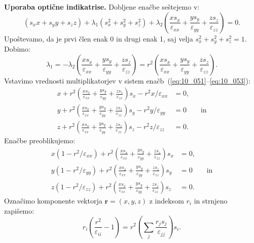 \begin{example}{\bf Uporaba optične indikatrise.}
Dobljene enačbe seštejemo v:
\begin{equation}
\left(s_xx+s_yy+s_zz \right) + \lambda_1 \left(s_x^2+s_y^2+s_z^2 \right) + \lambda_2 
\left( \frac{xs_x}{\varepsilon_{xx}} + \frac{ys_y}{\varepsilon_{yy}} + 
\frac{zs_z}{\varepsilon_{zz}} \right)= 0.
\label{eq:10_056}
\end{equation}
Upoštevamo, da je prvi člen enak 0 in drugi enak 1, saj velja $s_x^2+s_y^2+s_z^2=1$. Dobimo:
\begin{equation}
\lambda_1 = -\lambda_2 \left( \frac{xs_x}{\varepsilon_{xx}} + \frac{ys_y}{\varepsilon_{yy}} + 
\frac{zs_z}{\varepsilon_{zz}} \right) = r^2 \left( \frac{xs_x}{\varepsilon_{xx}} +
\frac{ys_y}{\varepsilon_{yy}} + 
\frac{zs_z}{\varepsilon_{zz}} \right)\!\!.
\label{eq:10_057}
\end{equation}
Vstavimo vrednosti multiplikatorjev v sistem enačb~(\ref{eq:10_051}--\ref{eq:10_053}):
\begin{align}
x + r^2 \left( \frac{xs_x}{\varepsilon_{xx}} + \frac{ys_y}{\varepsilon_{yy}} + 
\frac{zs_z}{\varepsilon_{zz}} \right) s_x -r^2 x/\varepsilon_{xx}&=0, \label{eq:10_058}\\
y + r^2 \left( \frac{xs_x}{\varepsilon_{xx}} + \frac{ys_y}{\varepsilon_{yy}} + 
\frac{zs_z}{\varepsilon_{zz}} \right)s_y -r^2 y/\varepsilon_{yy}&=0 \qquad \mathrm{in}\label{eq:10_059}\\
z + r^2 \left( \frac{xs_x}{\varepsilon_{xx}} + \frac{ys_y}{\varepsilon_{yy}} + 
\frac{zs_z}{\varepsilon_{zz}} \right) s_z -r^2 z/\varepsilon_{zz}&=0.\label{eq:10_060}
\end{align}
Enačbe preoblikujemo:
\begin{align}
x (1-r^2/\varepsilon_{xx})+ r^2 \left( \frac{xs_x}{\varepsilon_{xx}} + \frac{ys_y}{\varepsilon_{yy}} + 
\frac{zs_z}{\varepsilon_{zz}} \right) s_x&=0, \label{eq:10_061}\\
y (1-r^2/\varepsilon_{yy}) + r^2 \left( \frac{xs_x}{\varepsilon_{xx}} + \frac{ys_y}{\varepsilon_{yy}} + 
\frac{zs_z}{\varepsilon_{zz}} \right)s_y&=0 \qquad \mathrm{in}\label{eq:10_062}\\
z (1-r^2/\varepsilon_{zz})+ r^2 \left( \frac{xs_x}{\varepsilon_{xx}} + \frac{ys_y}{\varepsilon_{yy}} + 
\frac{zs_z}{\varepsilon_{zz}} \right) s_z&=0.\label{eq:10_063}
\end{align}
Označimo komponente vektorja $\mathbf{r}= (x,y,z)$ z indeksom $r_i$ in strnjeno zapišemo:
\begin{equation}
r_i \left(\frac{r^2}{\varepsilon_{ii}} -1\right) =  
r^2\left( \sum_{j}\frac{r_j s_j}{\varepsilon_{jj}}\right) s_i.

\end{equation}
\end{example}
